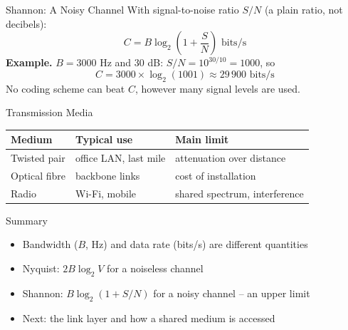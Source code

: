 \documentclass[aspectratio=169,11pt]{beamer}
\begin{document}
\begin{frame}{Shannon: A Noisy Channel}
  With signal-to-noise ratio $S/N$ (a plain ratio, not decibels):
  \[
    C = B\log_2\!\left(1 + \frac{S}{N}\right) \text{ bits/s}
  \]
  \textbf{Example.} $B = 3000$ Hz and $30$ dB: $S/N = 10^{30/10} = 1000$, so
  \[
    C = 3000 \times \log_2(1001) \approx 29\,900 \text{ bits/s}
  \]
  No coding scheme can beat $C$, however many signal levels are used.
\end{frame}

\begin{frame}{Transmission Media}
  \begin{center}
  \begin{tabular}{lll}
    \hline
    Medium & Typical use & Main limit \\
    \hline
    Twisted pair & office LAN, last mile & attenuation over distance \\
    Optical fibre & backbone links & cost of installation \\
    Radio & Wi-Fi, mobile & shared spectrum, interference \\
    \hline
  \end{tabular}
  \end{center}
\end{frame}

\begin{frame}{Summary}
  \begin{itemize}
    \item Bandwidth ($B$, Hz) and data rate (bits/s) are different quantities
    \item Nyquist: $2B\log_2 V$ for a noiseless channel
    \item Shannon: $B\log_2(1 + S/N)$ for a noisy channel -- an upper limit
    \item Next: the link layer and how a shared medium is accessed
  \end{itemize}
\end{frame}
\end{document}
